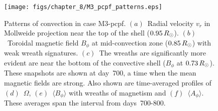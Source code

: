 \begin{figure}
  \begin{center}
    \texttt{[image: figs/chapter\_8/M3\_pcpf\_patterns.eps]}
  \end{center}
  \caption[Patterns of convection in case M3-pcpf]
	  {Patterns of convection in case M3-pcpf.  
  $(a)$~Radial velocity $v_r$ in Mollweide projection
  near the top of the shell ($0.95\thinspace R_\odot$).  
  $(b)$~Toroidal magnetic field $B_\phi$ at mid-convection zone
  ($0.85\thinspace R_\odot$) with weak wreath signatures.
  $(c)$~The wreaths are significantly more evident are near the bottom of the
  convective shell ($B_\phi$ at $0.73\thinspace R_\odot$).
  These snapshots are shown at day~700, a time when the mean
  magnetic fields are strong.
  Also shown are time-averaged profiles of $(d)$~$\Omega$, 
  $(e)$~$\langle B_\phi \rangle$ with wreaths of magnetism and
  $(f)$~$\langle A_\phi \rangle$.  These averages span the interval from
  days~700-800.
          \label{fig:M3-pcpf}}
\end{figure}

